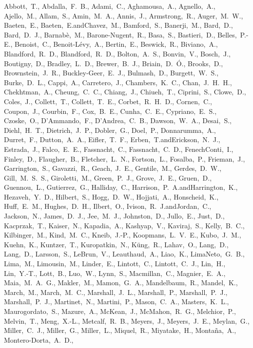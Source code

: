 \scriptsize
Abbott,~T.,
Abdalla,~F.~B.,
Adami,~C.,
Aghamousa,~A.,
Agnello,~A.,
Ajello,~M.,
Allam,~S.,
Amin,~M.~A.,
Annis,~J.,
Armstrong,~R.,
Auger,~M.~W.,
Baeten,~E.,
Baeten,~E.andChavez,~M.,
Bamford,~S.,
Banerji,~M.,
Bard,~D.,
Bard,~D.~J.,
Barnab\`{e},~M.,
Barone-Nugent,~R.,
Basa,~S.,
Bastieri,~D.,
Belles,~P.-E.,
Benoist,~C.,
Benoit-L\'{e}vy,~A.,
Bertin,~E.,
Beswick,~R.,
Biviano,~A.,
Blandford,~R.~D.,
Blandford,~R.~D.,
Bolton,~A.~S.,
Bonvin,~V.,
Bosch,~J.,
Boutigny,~D.,
Bradley,~L.~D.,
Brewer,~B.~J.,
Briain,~D.~\'{O}.,
Brooks,~D.,
Brownstein,~J.~R.,
Buckley-Geer,~E.~J.,
Bulmash,~D.,
Burgett,~W.~S.,
Burke,~D.~L.,
Cappi,~A.,
Carretero,~J.,
Chambers,~K.~C.,
Chan,~J.~H.~H.,
Chekhtman,~A.,
Cheung,~C.~C.,
Chiang,~J.,
Chiueh,~T.,
Ciprini,~S.,
Clowe,~D.,
Coles,~J.,
Collett,~T.,
Collett,~T.~E.,
Corbet,~R.~H.~D.,
Cornen,~C.,
Coupon,~J.,
Courbin,~F.,
Cox,~B.~E.,
Cunha,~C.~E.,
Cypriano,~E.~S.,
Czoske,~O.,
D'Ammando,~F.,
D'Andrea,~C.~B.,
Dawson,~W.~A.,
Desai,~S.,
Diehl,~H.~T.,
Dietrich,~J.~P.,
Dobler,~G.,
Doel,~P.,
Donnarumma,~A.,
Durret,~F.,
Dutton,~A.~A.,
Eifler,~T.~F.,
Erben,~T.andErickson,~N.~J.,
Estrada,~J.,
Falco,~E.~E.,
Fassnacht,~C.,
Fassnacht,~C.~D.,
FenechConti,~I.,
Finley,~D.,
Flaugher,~B.,
Fletcher,~L.~N.,
Fortson,~L.,
Fosalba,~P.,
Frieman,~J.,
Garrington,~S.,
Gavazzi,~R.,
Geach,~J.~E.,
Gentile,~M.,
Gerdes,~D.~W.,
Gill,~M.~S.~S.,
Giroletti,~M.,
Green,~P.~J.,
Grove,~J.~E.,
Gruen,~D.,
Guennou,~L.,
Gutierrez,~G.,
Halliday,~C.,
Harrison,~P.~A.andHarrington,~K.,
Hezaveh,~Y.~D.,
Hilbert,~S.,
Hogg,~D.~W.,
Hojjati,~A.,
Honscheid,~K.,
Huff,~E.~M.,
Hughes,~D.~H.,
Ilbert,~O.,
Ivison,~R.~J.andJordan,~C.,
Jackson,~N.,
James,~D.~J.,
Jee,~M.~J.,
Johnston,~D.,
Jullo,~E.,
Just,~D.,
Kacprzak,~T.,
Kaiser,~N.,
Kapadia,~A.,
Kashyap,~V.,
Kaviraj,~S.,
Kelly,~B.~C.,
Kilbinger,~M.,
Kind,~M.~C.,
Kneib,~J.-P.,
Koopmans,~L.~V.~E.,
Kubo,~J.~M.,
Kuehn,~K.,
Kuntzer,~T.,
Kuropatkin,~N.,
K\"{u}ng,~R.,
Lahav,~O.,
Lang,~D.,
Lang,~D.,
Larsson,~S.,
LeBrun,~V.,
Leauthaud,~A.,
Liao,~K.,
LimaNeto,~G.~B.,
Lima,~M.,
Limousin,~M.,
Linder,~E.,
Lintott,~C.,
Lintott,~C.~J.,
Lin,~H.,
Lin,~Y.-T.,
Lott,~B.,
Luo,~W.,
Lynn,~S.,
Macmillan,~C.,
Magnier,~E.~A.,
Maia,~M.~A.~G.,
Makler,~M.,
Mamon,~G.~A.,
Mandelbaum,~R.,
Mandel,~K.,
March,~M.,
March,~M.~C.,
Marshall,~J.~L.,
Marshall,~P.,
Marshall,~P.~J.,
Marshall,~P.~J.,
Martinet,~N.,
Martini,~P.,
Mason,~C.~A.,
Masters,~K.~L.,
Maurogordato,~S.,
Mazure,~A.,
McKean,~J.,
McMahon,~R.~G.,
Melchior,~P.,
Melvin,~T.,
Meng,~X.-L.,
Metcalf,~R.~B.,
Meyers,~J.,
Meyers,~J.~E.,
Meylan,~G.,
Miller,~C.~J.,
Miller,~G.,
Miller,~L.,
Miquel,~R.,
Miyatake,~H.,
Monta\~{n}a,~A.,
Montero-Dorta,~A.~D.,
